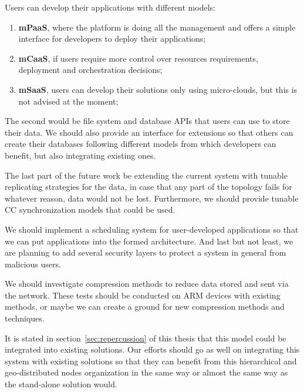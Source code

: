 Users can develop their applications with different models: 

\begin{enumerate}[start=1,label={(\bfseries \arabic*)}]
	\item \textbf{mPaaS}, where the platform is doing all the management and offers a simple interface for developers to deploy their applications;
	\item \textbf{mCaaS}, if users require more control over resources requirements, deployment and orchestration decisions;
	\item \textbf{mSaaS}, users can develop their solutions only using micro-clouds, but this is not advised at the moment;
\end{enumerate}

\noindent
The second would be file system and database APIs that users can use to store their data. We should also provide an interface for extensions so that others can create their databases following different models from which developers can benefit, but also integrating existing ones.

The last part of the future work be extending the current system with tunable replicating strategies for the data, in case that any part of the topology fails for whatever reason, data would not be lost. Furthermore, we should provide tunable CC synchronization models that could be used.

We should implement a scheduling system for user-developed applications so that we can put applications into the formed architecture. And last but not least, we are planning to add several security layers to protect a system in general from malicious users.

We should investigate compression methods to reduce data stored and sent via the network. These tests should be conducted on ARM devices with existing methods, or maybe we can create a ground for new compression methods and techniques.

It is stated in section~\ref{sec:repercussion} of this thesis that this model could be integrated into existing solutions. Our efforts should go as well on integrating this system with existing solutions so that they can benefit from this hierarchical and geo-distributed nodes organization in the same way or almost the same way as the stand-alone solution would.
%
%